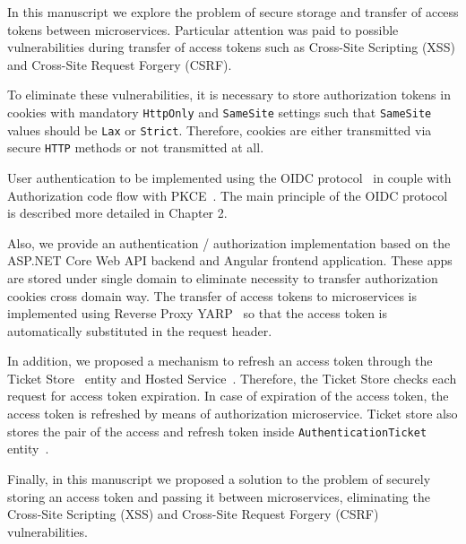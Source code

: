 In this manuscript we explore the problem of secure storage and transfer of access tokens between microservices.
Particular attention was paid to possible vulnerabilities during transfer of access tokens such
as Cross-Site Scripting (XSS) and Cross-Site Request Forgery (CSRF).

To eliminate these vulnerabilities, it is necessary to store authorization tokens in cookies with mandatory
\texttt{HttpOnly} and \texttt{SameSite} settings such that \texttt{SameSite} values should be \texttt{Lax} or \texttt{Strict}.
Therefore, cookies are either transmitted via secure \texttt{HTTP} methods or not transmitted at all.

User authentication to be implemented using the OIDC protocol~\cite{siriwardenaOpenid2020, sakimuraOpenid2014}
in couple with Authorization code flow with PKCE~\cite{bradley2015rfc}.
The main principle of the OIDC protocol is described more detailed in Chapter 2.

Also, we provide an authentication / authorization implementation based on the ASP.NET Core Web API backend and Angular
frontend application.
These apps are stored under single domain to eliminate necessity to transfer authorization cookies cross domain way.
The transfer of access tokens to microservices is implemented using Reverse Proxy YARP~\cite{microsoftYarp2021} so that
the access token is automatically substituted in the request header.

In addition, we proposed a mechanism to refresh an access token through the Ticket Store~\cite{microsoftIticketstore2023} entity
and Hosted Service~\cite{microsoftHostedservice2023}.
Therefore, the Ticket Store checks each request for access token expiration.
In case of expiration of the access token, the access token is refreshed by means of authorization microservice.
Ticket store also stores the pair of the access and refresh token inside \texttt{AuthenticationTicket} entity~\cite{microsoftAuthenticationTicket2023}.

Finally, in this manuscript we proposed a solution to the problem of securely storing an access token and passing it between microservices,
eliminating the Cross-Site Scripting (XSS) and Cross-Site Request Forgery (CSRF) vulnerabilities.